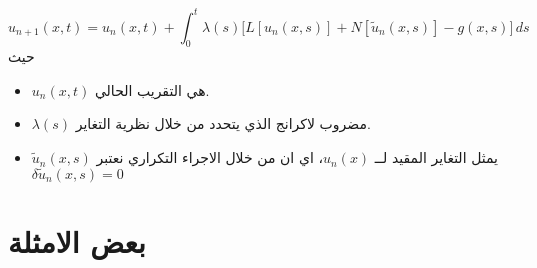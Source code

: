 \begin{equation}
	u_{n+1}(x, t) = u_n(x, t) + \int_{0}^{t} \lambda(s) \big[L[u_n(x, s)] + N[\tilde{u}_n(x, s)] - g(x, s)\big] \, ds 
\end{equation}
حيث
\begin{itemize}
	\item $u_n(x, t)$ هي التقريب الحالي.
	\item $\lambda(s)$ مضروب لاكرانج الذي يتحدد من خلال نظرية التغاير.
	\item $\tilde{u}_n(x, s)$ يمثل التغاير المقيد لــ $u_n(x)$، اي ان من خلال الاجراء التكراري نعتبر \\$\delta\tilde{u}_n(x, s) = 0$
\end{itemize}

\newpage

\section{بعض الامثلة}

